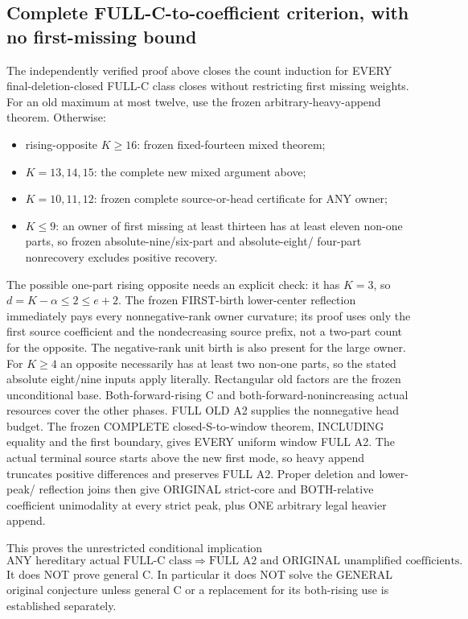 \subsection{Complete FULL-C-to-coefficient criterion, with no first-missing bound}
The independently verified proof above closes the count induction for EVERY final-deletion-closed FULL-C class closes
without restricting first missing weights. For an old maximum at most
twelve, use the frozen arbitrary-heavy-append theorem. Otherwise:
\begin{itemize}
\item rising-opposite $K\ge16$: frozen fixed-fourteen mixed theorem;
\item $K=13,14,15$: the complete new mixed argument above;
\item $K=10,11,12$: frozen complete source-or-head certificate for ANY owner;
\item $K\le9$: an owner of first missing at least thirteen has at least
eleven non-one parts, so frozen absolute-nine/six-part and absolute-eight/
four-part nonrecovery excludes positive recovery.
\end{itemize}
The possible one-part rising opposite needs an explicit check: it has
$K=3$, so $d=K-\alpha\le2\le e+2$. The frozen FIRST-birth lower-center
reflection immediately pays every nonnegative-rank owner curvature;
its proof uses only the first source coefficient and the nondecreasing
source prefix, not a two-part count for the opposite. The negative-rank
unit birth is also present for the large owner. For $K\ge4$ an opposite
necessarily has at least two non-one parts, so the stated absolute
eight/nine inputs apply literally. Rectangular old factors are the
frozen unconditional base.
Both-forward-rising C and both-forward-nonincreasing actual resources
cover the other phases. FULL OLD A2 supplies the nonnegative head budget.
The frozen COMPLETE closed-S-to-window theorem, INCLUDING equality and
the first boundary, gives EVERY uniform window FULL A2. The actual
terminal source starts above the new first mode, so heavy append truncates
positive differences and preserves FULL A2. Proper deletion and lower-peak/
reflection joins then give ORIGINAL strict-core and BOTH-relative coefficient
unimodality at every strict peak, plus ONE arbitrary legal heavier append.

This proves the unrestricted conditional implication
\[
 \boxed{\text{ANY hereditary actual FULL-C class}
        \Longrightarrow\text{FULL A2 and ORIGINAL unamplified coefficients}.}
\]
It does NOT prove general C. In particular it does NOT solve the
GENERAL original conjecture unless general C or a replacement for its
both-rising use is established separately.

